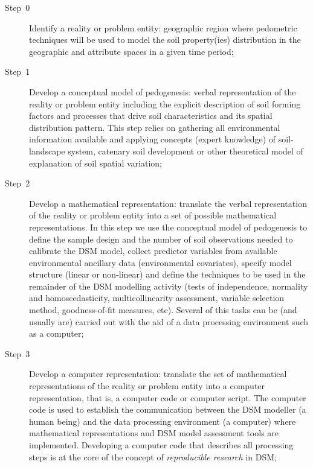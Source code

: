 \begin{description}
  \item [{Step~0}] Identify a reality or problem entity: geographic region where
  pedometric techniques will be used to model the soil property(ies) distribution
  in the geographic and attribute spaces in a given time period;

  \item [{Step~1}] Develop a conceptual model of pedogenesis: verbal 
  representation of the reality or problem entity including the explicit 
  description of soil forming factors and processes that drive soil 
  characteristics and its spatial distribution pattern. This step relies on 
  gathering all environmental information available and applying concepts 
  (expert knowledge) of soil-landscape system, catenary soil development or 
  other theoretical model of explanation of soil spatial variation;

  \item [{Step~2}] Develop a mathematical representation: translate the verbal 
  representation of the reality or problem entity into a set of possible 
  mathematical representations. In this step we use the conceptual model of 
  pedogenesis to define the sample design and the number of soil observations 
  needed to calibrate the DSM model, collect predictor variables from available 
  environmental ancillary data (environmental covariates), specify model 
  structure (linear or non-linear) and define the techniques to be used in the 
  remainder of the DSM modelling activity (tests of independence, normality and 
  homoscedasticity, multicollinearity assessment, variable selection method, 
  goodness-of-fit measures, etc). Several of this tasks can be (and usually are)
  carried out with the aid of a data processing environment such as a computer;

  \item [{Step~3}] Develop a computer representation: translate the set of 
  mathematical representations of the reality or problem entity into a computer 
  representation, that is, a computer code or computer script. The computer 
  code is used to establish the communication between the DSM modeller (a human 
  being) and the data processing environment (a computer) where mathematical 
  representations and DSM model assessment tools are implemented. Developing a 
  computer code that describes all processing steps is at the core of the 
  concept of \textit{reproducible research} in DSM;


\end{description}
